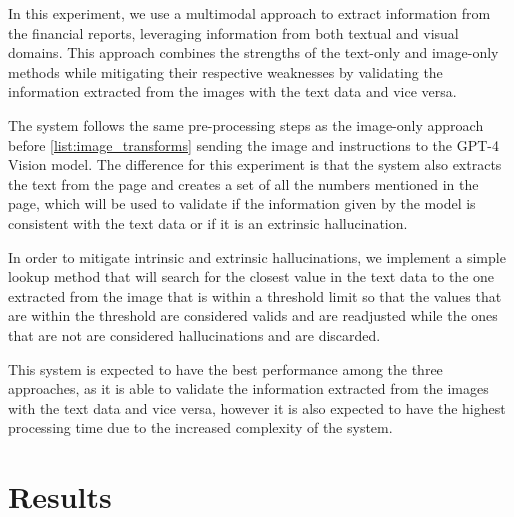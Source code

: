 \documentclass[english, 12pt, a4paper, elec, utf8, a-2b, online]{aaltothesis}
\begin{document}
In this experiment, we use a multimodal approach to extract information from the financial reports, leveraging information from both textual and visual domains.
This approach combines the strengths of the text-only and image-only methods while mitigating their respective weaknesses by validating the information extracted from the images with the text data and vice versa.

The system follows the same pre-processing steps as the image-only approach before \ref{list:image_transforms} sending the image and instructions to the \ac{GPT}-4 Vision model.
The difference for this experiment is that the system also extracts the text from the page and creates a set of all the numbers mentioned in the page, which will be used to validate if the information given by the model is consistent with the text data or if it is an extrinsic hallucination.

In order to mitigate intrinsic and extrinsic hallucinations, we implement a simple lookup method that will search for the closest value in the text data to the one extracted from the image that is within a threshold limit so that the values that are within the threshold are considered valids and are readjusted while the ones that are not are considered hallucinations and are discarded.

This system is expected to have the best performance among the three approaches, as it is able to validate the information extracted from the images with the text data and vice versa, however it is also expected to have the highest processing time due to the increased complexity of the system.

\clearpage
\section{Results}

\end{document}
